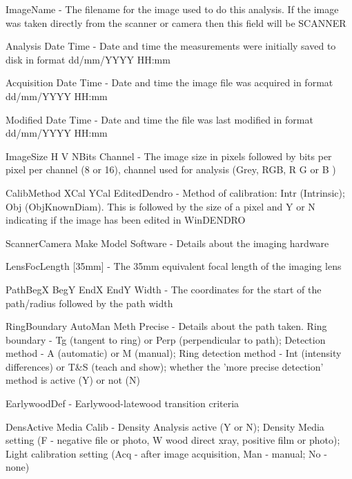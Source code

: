 \documentclass[10pt, headsepline,DIV14,BCOR0.5cm]{scrreprt}
\begin{document}
\begin{itemize*}
 \item ImageName - The filename for the image used to do this analysis. If the image was taken directly from the scanner or camera then this field will be SCANNER
\item 

Analysis Date Time - Date and time the measurements were initially saved to disk in format dd/mm/YYYY HH:mm
\item 

Acquisition Date Time - Date and time the image file was acquired in format dd/mm/YYYY HH:mm
\item 

Modified Date Time - Date and time the file was last modified in format dd/mm/YYYY HH:mm
\item 

ImageSize H V NBits Channel - The image size in pixels followed by bits per pixel per channel (8 or 16), channel used for analysis (Grey, RGB, R G or B )
\item 

CalibMethod XCal YCal EditedDendro - Method of calibration: Intr (Intrinsic); Obj (ObjKnownDiam). This is followed by the size of a pixel and Y or N indicating if the image has been edited in WinDENDRO
\item 

ScannerCamera Make Model Software - Details about the imaging hardware
\item 

LensFocLength [35mm] - The 35mm equivalent focal length of the imaging lens
\item 

PathBegX BegY EndX EndY Width - The coordinates for the start of the path/radius followed by the path width
\item 

RingBoundary AutoMan Meth Precise - Details about the path taken. Ring boundary - Tg (tangent to ring) or Perp (perpendicular to path); Detection method - A (automatic) or M (manual); Ring detection method - Int (intensity differences) or T\&S (teach and show); whether the 'more precise detection' method is active (Y) or not (N)
\item 

EarlywoodDef - Earlywood-latewood transition criteria
\item 

DensActive Media Calib - Density Analysis active (Y or N); Density Media setting (F - negative file or photo, W wood direct xray, positive film or photo); Light calibration setting (Acq - after image acquisition, Man - manual; No - none)
\item 


\end{itemize*}
\end{document}
